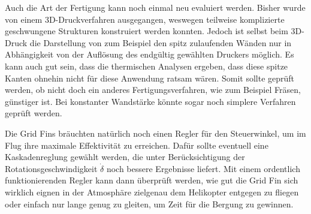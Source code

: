 Auch die Art der Fertigung kann noch einmal neu evaluiert werden. Bisher wurde von einem 3D-Druckverfahren ausgegangen, weswegen teilweise komplizierte geschwungene Strukturen konstruiert werden konnten. Jedoch ist selbst beim 3D-Druck die Darstellung von zum Beispiel den spitz zulaufenden Wänden nur in Abhängigkeit von der Auflösung des endgültig gewählten Druckers möglich. Es kann auch gut sein, dass die thermischen Analysen ergeben, dass diese spitze Kanten ohnehin nicht für diese Anwendung ratsam wären. Somit sollte geprüft werden, ob nicht doch ein anderes Fertigungsverfahren, wie zum Beispiel Fräsen, günstiger ist. Bei konstanter Wandstärke könnte sogar noch simplere Verfahren geprüft werden.

Die Grid Fins bräuchten natürlich noch einen Regler für den Steuerwinkel, um im Flug ihre maximale Effektivität zu erreichen. Dafür sollte eventuell eine Kaskadenreglung gewählt werden, die unter Berücksichtigung der Rotationsgeschwindigkeit $\dot{\delta}$ noch bessere Ergebnisse liefert. Mit einem ordentlich funktionierenden Regler kann dann überprüft werden, wie gut die Grid Fin sich wirklich eignen in der Atmosphäre zielgenau dem Helikopter entgegen zu fliegen oder einfach nur lange genug zu gleiten, um Zeit für die Bergung zu gewinnen.
